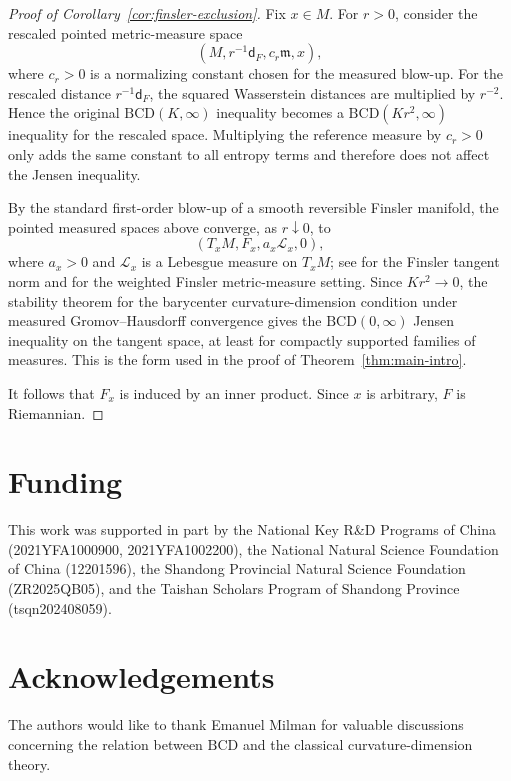 \documentclass[a4paper,11pt]{article}
\numberwithin{equation}{section}
\begin{document}
	\begin{proof}[Proof of Corollary~\ref{cor:finsler-exclusion}]
		Fix \(x\in M\). For \(r>0\), consider the rescaled pointed metric-measure space
		\[
		(M,r^{-1}\mathsf d_F,c_r\mathfrak m,x),
		\]
		where \(c_r>0\) is a normalizing constant chosen for the measured blow-up. For the
		rescaled distance \(r^{-1}\mathsf d_F\), the squared Wasserstein distances are
		multiplied by \(r^{-2}\). Hence the original \(\mathrm{BCD}(K,\infty)\) inequality
		becomes a \(\mathrm{BCD}(K r^2,\infty)\) inequality for the rescaled space. Multiplying
		the reference measure by \(c_r>0\) only adds the same constant to all entropy terms and
		therefore does not affect the Jensen inequality.
		
		By the standard first-order blow-up of a smooth reversible Finsler manifold, the pointed
		measured spaces above converge, as \(r\downarrow0\), to
		\[
		(T_xM,F_x,a_x\mathcal L_x,0),
		\]
		where \(a_x>0\) and \(\mathcal L_x\) is a Lebesgue measure on \(T_xM\); see
		\cite[Chapter~1]{BaoChernShen} for the Finsler tangent norm and \cite{OhtaSturm} for the
		weighted Finsler metric-measure setting. Since \(K r^2\to0\), the stability theorem for
		the barycenter curvature-dimension condition under measured Gromov--Hausdorff convergence
		\cite[Theorem~6.6]{HanLiuZhuBCD} gives the \(\mathrm{BCD}(0,\infty)\) Jensen inequality
		on the tangent space, at least for compactly supported families of measures. This is the
		form used in the proof of Theorem~\ref{thm:main-intro}.
		
		It follows that \(F_x\) is induced by an inner product. Since
		\(x\) is arbitrary, \(F\) is Riemannian.
	\end{proof}
	
	
	
	
	
	
	\bigskip
	
	\section*{Funding}\label{sec:funding}
	This work was supported in part by the National Key R\&D Programs of China (2021YFA1000900, 2021YFA1002200), the National Natural Science Foundation of China (12201596), the Shandong Provincial Natural Science Foundation (ZR2025QB05), and the Taishan Scholars Program of Shandong Province (tsqn202408059).
	
	\medskip
	
	\section*{Acknowledgements}\label{sec:acknowledgements}
	The authors would like to thank Emanuel Milman for valuable discussions concerning the relation between \(\mathrm{BCD}\) and the classical curvature-dimension theory.
	
\end{document}
